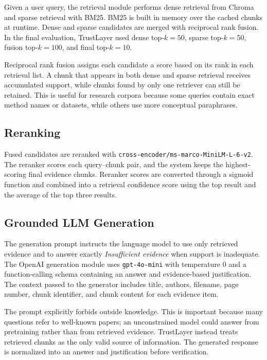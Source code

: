 \documentclass[11pt]{article}
\begin{document}
Given a user query, the retrieval module performs dense retrieval from Chroma and sparse retrieval with BM25. BM25 is built in memory over the cached chunks at runtime. Dense and sparse candidates are merged with reciprocal rank fusion. In the final evaluation, TrustLayer used dense top-$k=50$, sparse top-$k=50$, fusion top-$k=100$, and final top-$k=10$.

Reciprocal rank fusion assigns each candidate a score based on its rank in each retrieval list. A chunk that appears in both dense and sparse retrieval receives accumulated support, while chunks found by only one retriever can still be retained. This is useful for research corpora because some queries contain exact method names or datasets, while others use more conceptual paraphrases.

\subsection{Reranking}

Fused candidates are reranked with \texttt{cross-encoder/ms-marco-MiniLM-L-6-v2}. The reranker scores each query--chunk pair, and the system keeps the highest-scoring final evidence chunks. Reranker scores are converted through a sigmoid function and combined into a retrieval confidence score using the top result and the average of the top three results.

\subsection{Grounded LLM Generation}

The generation prompt instructs the language model to use only retrieved evidence and to answer exactly \emph{Insufficient evidence} when support is inadequate. The OpenAI generation module uses \texttt{gpt-4o-mini} with temperature 0 and a function-calling schema containing an answer and evidence-based justification. The context passed to the generator includes title, authors, filename, page number, chunk identifier, and chunk content for each evidence item.

The prompt explicitly forbids outside knowledge. This is important because many questions refer to well-known papers; an unconstrained model could answer from pretraining rather than from retrieved evidence. TrustLayer instead treats retrieved chunks as the only valid source of information. The generated response is normalized into an answer and justification before verification.
\end{document}
